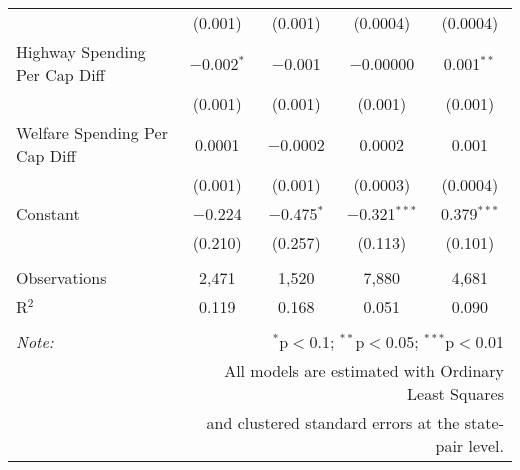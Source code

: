 \begin{table}[!htbp]
\begin{tabular}{@{\extracolsep{5pt}}lcccc}
  & (0.001) & (0.001) & (0.0004) & (0.0004) \\ 
  Highway Spending Per Cap Diff & $-$0.002$^{*}$ & $-$0.001 & $-$0.00000 & 0.001$^{**}$ \\ 
  & (0.001) & (0.001) & (0.001) & (0.001) \\ 
  Welfare Spending Per Cap Diff & 0.0001 & $-$0.0002 & 0.0002 & 0.001 \\ 
  & (0.001) & (0.001) & (0.0003) & (0.0004) \\ 
  Constant & $-$0.224 & $-$0.475$^{*}$ & $-$0.321$^{***}$ & 0.379$^{***}$ \\ 
  & (0.210) & (0.257) & (0.113) & (0.101) \\ 
 \hline \\[-1.8ex] 
Observations & 2,471 & 1,520 & 7,880 & 4,681 \\ 
R$^{2}$ & 0.119 & 0.168 & 0.051 & 0.090 \\ 
\hline 
\hline \\[-1.8ex] 
\textit{Note:}  & \multicolumn{4}{r}{$^{*}$p$<$0.1; $^{**}$p$<$0.05; $^{***}$p$<$0.01} \\ 
 & \multicolumn{4}{r}{All models are estimated with Ordinary Least Squares} \\ 
 & \multicolumn{4}{r}{and clustered standard errors at the state-pair level.} \\ 
\end{tabular} 
\end{table} 
